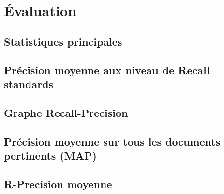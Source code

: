 \chapter{Évaluation}


\section{Statistiques principales}


\section{Précision moyenne aux niveau de Recall standards}


\section{Graphe Recall-Precision}


\section{Précision moyenne sur tous les documents pertinents (MAP)}


\section{R-Precision moyenne}


